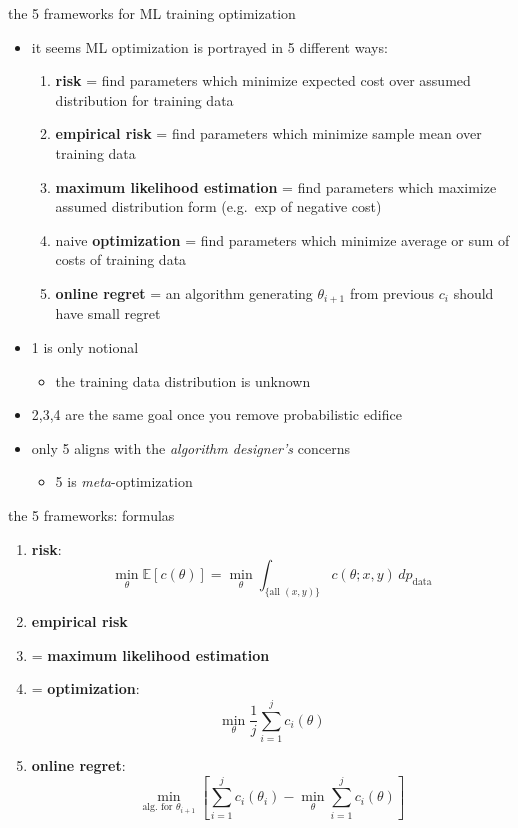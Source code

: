 \documentclass[xcolor={svgnames},
               hyperref={colorlinks,citecolor=DeepPink4,linkcolor=FireBrick,urlcolor=Maroon}]
               {beamer}
\newcommand{\EE}{\mathbb{E}}
\begin{document}
\begin{frame}{the 5 frameworks for ML training optimization}

\begin{itemize}
\item it seems ML optimization is portrayed in 5 different ways:

\medskip
    \begin{enumerate}
    \item[1.] \textbf{risk} = find parameters which minimize expected cost over assumed distribution for training data
    \item[2.] \textbf{empirical risk} = find parameters which minimize sample mean over training data
    \item[3.] \textbf{maximum likelihood estimation} = find parameters which maximize assumed distribution form (e.g.~exp of negative cost)
    \item[4.] naive \textbf{optimization} = find parameters which minimize average or sum of costs of training data
    \item[5.] \textbf{online regret} = an algorithm generating $\theta_{i+1}$ from previous $c_i$ should have small regret
    \end{enumerate}

\bigskip
\item 1 is only notional
    \begin{itemize}
    \item[$-$] the training data distribution is unknown
    \end{itemize}
\item 2,3,4 are the same goal once you remove probabilistic edifice
\item only 5 aligns with the \emph{algorithm designer's} concerns
    \begin{itemize}
    \item[$-$] 5 is \emph{meta}-optimization
    \end{itemize}
\end{itemize}
\end{frame}


\begin{frame}{the 5 frameworks: formulas}

\begin{enumerate}
\item[1.] \textbf{risk}:
    $$\min_\theta \EE[c(\theta)] = \min_\theta \int_{\{\text{all } (x,y)\}} c(\theta;x,y)\,dp_{\text{data}}$$
\item[2.] \textbf{empirical risk}
\item[3.] = \textbf{maximum likelihood estimation}
\item[4.] = \textbf{optimization}:
    $$\min_\theta \frac{1}{j} \sum_{i=1}^j c_i(\theta)$$
\item[5.] \textbf{online regret}:
    $$\min_{\text{alg.~for } \theta_{i+1}} \left[\sum_{i=1}^j c_i(\theta_i) - \min_\theta \sum_{i=1}^j c_i(\theta)\right]$$
\end{enumerate}
\end{frame}
\end{document}

